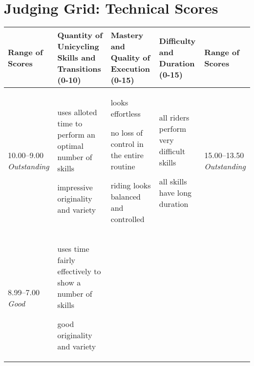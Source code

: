 \section{Judging Grid: Technical Scores}
\begin{minipage}{\textwidth}
\begingroup
    \fontsize{7pt}{9pt}\selectfont
\setlength{\LTleft}{-2.5cm}
\begin{longtable}{|p{1.5cm}|p{5cm}|p{5cm}|p{5cm}|p{1.5cm}|}
\hline
\textbf{Range of Scores} &
\textbf{Quantity of Unicycling Skills and \newline Transitions (0-10)} &
\textbf{Mastery and Quality of Execution \newline (0-15)} &
\textbf{Difficulty and Duration \newline (0-15)} &
\textbf{Range of Scores} \\
\hline
10.00--9.00 \newline
\emph{Outstanding} &

\begin{judging_items}%
\item uses alloted time to perform an optimal number of skills
\item impressive originality and variety
\end{judging_items} &

\begin{judging_items}%
\item looks effortless
\item no loss of control in the entire routine
\item riding looks balanced and controlled
\end{judging_items} &

\begin{judging_items}%
\item all riders perform very difficult skills
\item all skills have long duration
\end{judging_items} &

15.00--13.50 \newline
\emph{Outstanding} \\
\hline

8.99--7.00 \newline
\emph{Good} &

\begin{judging_items}%
\item uses time fairly effectively to show a number of skills
\item good originality and variety
\end{judging_items} &


\end{longtable}
\end{minipage}
